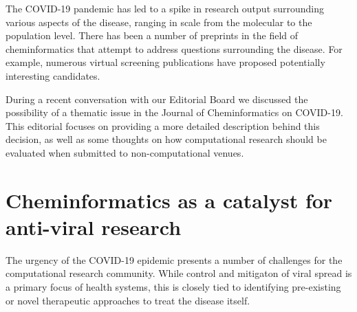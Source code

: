 \documentclass{bmcart}
\begin{document}






The COVID-19 pandemic has led to a spike in research output
surrounding various aspects of the disease, ranging in scale from the
molecular to the population level.  There has been a number of
preprints in the field of cheminformatics that attempt to address
questions surrounding the disease. For example, numerous virtual
screening publications have proposed potentially interesting
candidates.

During a recent conversation with our Editorial Board we discussed the
possibility of a thematic issue in the Journal of Cheminformatics on
COVID-19. This editorial focuses on providing a more detailed
description behind this decision, as well as some thoughts on how
computational research should be evaluated when submitted to
non-computational venues.

\section*{Cheminformatics as a catalyst for anti-viral research}

The urgency of the COVID-19 epidemic presents a number of challenges
for the computational research community. While control and mitigaton of viral
spread is a primary focus of health systems, this is closely tied to
identifying pre-existing or novel therapeutic approaches to treat the
disease itself.
\end{document}
